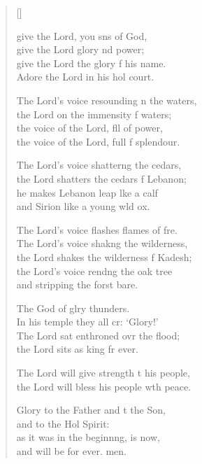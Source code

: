 \settowidth{\versewidth}{The Lord’s voice resounding on the waters, *}
\begin{verse}[\versewidth]
  \begin{patverse}
     give the Lord, you sns of God,\Med\\
    give the Lord glory nd power;\\
give the Lord the glory f his name.\Med\\
    Adore the Lord in his hol court.

The Lord’s voice resounding n the waters,\Med\\
    the Lord on the immensity f waters;\\
the voice of the Lord, fll of power,\Med\\
    the voice of the Lord, full f splendour.

The Lord’s voice shatterng the cedars,\Med\\
    the Lord shatters the cedars f Lebanon;\\
he makes Lebanon leap lke a calf\Med\\
    and Sirion like a young w\pointup{\i}ld ox.

The Lord’s voice flashes flames of f\pointup{\i}re.\Flex\\
    The Lord’s voice shakng the wilderness,\Med\\
    the Lord shakes the wilderness f Kadesh;\\
the Lord’s voice rendng the oak tree\Med\\
    and stripping the forst bare.

The God of glry thunders.\Med\\
    In his temple they all cr: ‘Glory!’\\
The Lord sat enthroned ovr the flood;\Med\\
    the Lord sits as king fr ever.

The Lord will give strength t his people,\Med\\
    the Lord will bless his people w\pointup{\i}th peace.

Glory to the Father and t the Son,\Med\\
    and to the Hol Spirit:\\
as it was in the beginnng, is now,\Med\\
    and will be for ever. men.
  \end{patverse}
\end{verse}
